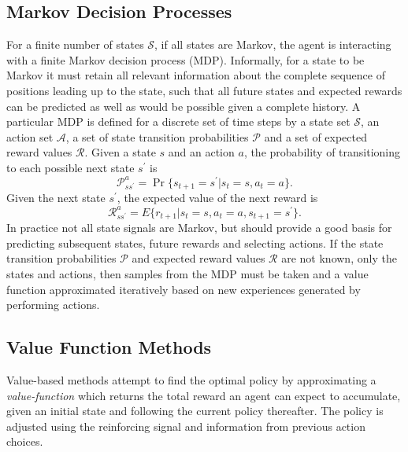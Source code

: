 \subsection{Markov Decision Processes}
For a finite number of states $\mathcal{S}$, if all states are Markov, the
agent is interacting with a finite Markov decision process (MDP).  Informally,
for a state to be Markov it must retain all relevant information about the
complete sequence of positions leading up to the state, such that all future
states and expected rewards can be predicted as well as would be possible given
a complete history.  A particular MDP is defined for a discrete set of time
steps by a state set $\mathcal{S}$, an action set $\mathcal{A}$, a set of state
transition probabilities $\mathcal{P}$ and a set of expected reward values
$\mathcal{R}$.  Given a state $s$ and an action $a$, the probability of
transitioning to each possible next state $s^\prime$ is
\begin{equation}
\mathcal{P}^a_{ss^\prime} = \Pr \bigl\lbrace s_{t+1} = s^\prime \vert s_t=s,
a_t=a \bigr\rbrace .
\end{equation}
Given the next state $s^\prime$, the expected value of the next reward is
\begin{equation}
\mathcal{R}^a_{ss^\prime} = E \bigl\lbrace r_{t+1} \vert s_t=s, a_t=a,
s_{t+1}=s^\prime \bigr\rbrace .
\end{equation}
In practice not all state signals are Markov, but should provide a good basis
for predicting subsequent states, future rewards and selecting actions.  If the
state transition probabilities $\mathcal{P}$ and expected reward values
$\mathcal{R}$ are not known, only the states and actions, then samples from the
MDP must be taken and a value function approximated iteratively based on new
experiences generated by performing actions.

\subsection{Value Function Methods}
\label{sec:valuebased}
Value-based methods attempt to find the optimal policy by
approximating a \textit{value-function} which returns the total reward an
agent can expect to accumulate, given an initial state and following the
current policy thereafter.  The policy is adjusted using the reinforcing
signal and information from previous action choices.

